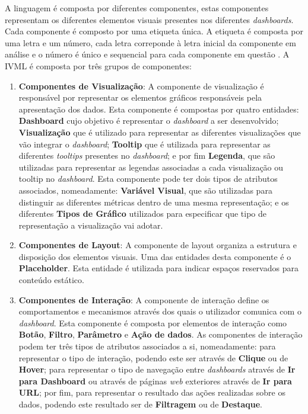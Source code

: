 A linguagem é composta por diferentes componentes, estas componentes representam os diferentes elementos visuais presentes nos diferentes \textit{dashboards}. Cada componente é composto por uma etiqueta única. A etiqueta é composta por uma letra e um número, cada letra correponde à letra inicial da componente em análise e o número é único e sequencial para cada componente em questão \cite{Ferreira2023IVML}. A \gls{IVML} é composta por três grupos de componentes: 

\begin{enumerate}
  \item \textbf{Componentes de Visualização}: A componente de visualização é responsável por representar os elementos gráficos responsáveis pela apresentação dos dados. Esta componente é compostas por quatro entidades: \textbf{Dashboard} cujo objetivo é representar o \textit{dashboard} a ser desenvolvido; \textbf{Visualização} que é utilizado para representar as diferentes visualizações que vão integrar o \textit{dashboard}; \textbf{Tooltip} que é utilizada para representar as diferentes \textit{tooltips} presentes no \textit{dashboard}; e por fim \textbf{Legenda}, que são utilizadas para representar as legendas associadas a cada visualização ou tooltip no \textit{dashboard}. Esta componente pode ter dois tipos de atributos associados, nomeadamente: \textbf{Variável Visual}, que são utilizadas para distinguir as diferentes métricas dentro de uma mesma representação; e os diferentes \textbf{Tipos de Gráfico} utilizados para especificar que tipo de representação a visualização vai adotar.
  \item \textbf{Componentes de Layout}: A componente de layout organiza a estrutura e disposição dos elementos visuais. Uma das entidades desta componente é o \textbf{Placeholder}. Esta entidade é utilizada para indicar espaços reservados para conteúdo estático. 
  \item \textbf{Componentes de Interação}: A componente de interação define os comportamentos e mecanismos através dos quais o utilizador comunica com o \textit{dashboard}. Esta componente é composta por elementos de interação como \textbf{Botão}, \textbf{Filtro}, \textbf{Parâmetro} e \textbf{Ação de dados}. As componentes de interação podem ter três tipos de atributos associados a si, nomeadamente: para representar o tipo de interação, podendo este ser através de \textbf{Clique} ou de \textbf{Hover}; para representar o tipo de navegação entre \textit{dashboards} através de \textbf{Ir para Dashboard} ou através de páginas \textit{web} exteriores através de \textbf{Ir para URL}; por fim, para representar o resultado das ações realizadas sobre os dados, podendo este resultado ser de \textbf{Filtragem} ou de \textbf{Destaque}.
\end{enumerate}

